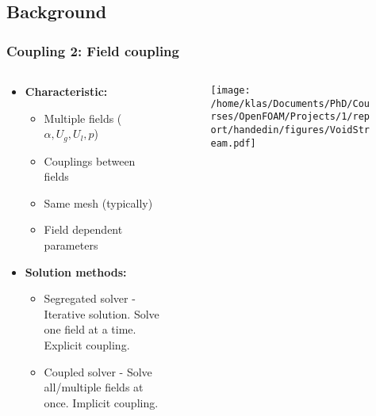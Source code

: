 \documentclass[9pt,handout]{beamer} %
\begin{document}
\subsection{Background}
\begin{frame}%
\frametitle{Coupling 2: Field coupling}
\begin{columns}
    \begin{column}[]{0.6\textwidth}
    \begin{itemize}
    \item {\bf Characteristic:}
    \begin{itemize}
        \item Multiple fields ($\alpha, U_g, U_l, p$)
        \item Couplings between fields
        \item Same mesh (typically)
        \item Field dependent parameters
    \end{itemize}
    \item<2>{\bf Solution methods:}
    \begin{itemize}
        \item Segregated solver - Iterative solution. Solve one field at a time. Explicit coupling.
        \item Coupled solver - Solve all/multiple fields at once. Implicit coupling.
    \end{itemize}
    \end{itemize}
    \end{column}
    \begin{column}[]{0.4\textwidth}
    \begin{figure}[ht]
        \centering
        \texttt{[image: /home/klas/Documents/PhD/Courses/OpenFOAM/Projects/1/report/handedin/figures/VoidStream.pdf]}
        \caption{}
    \end{figure}
    \end{column}
\end{columns}
\pause
\vfill
\end{frame}
\end{document}
